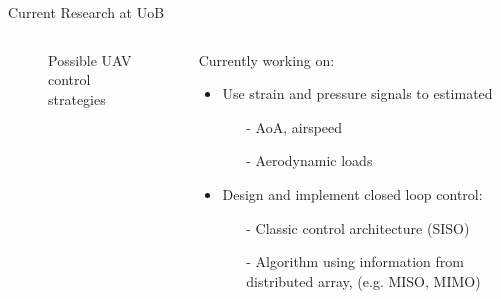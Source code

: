 \documentclass[aspectratio=169]{beamer}            %
\begin{document}
\begin{frame}{Current Research at UoB}

  \vspace{-1.5em}
	\begin{columns}
	  \begin{column}{0.6\textwidth}
		  \begin{figure}[!htb]
        \centering
				
				\caption{Possible UAV control strategies}
				\label{fig:ANN_UAVCtrl_BlockDiagram}
      \end{figure}
		\end{column}
    \begin{column}{0.4\textwidth}
		  Currently working on:
      \pause
      \begin{itemize}[<+->]
        \item{Use strain and pressure signals to estimated}
			  \begin{itemize}[<+->]
			    \item[-]{AoA, airspeed}
          \item[-]{Aerodynamic loads}
			  \end{itemize}
		    \item{Design and implement closed loop control:}
			  \begin{itemize}[<+->]
			    \item[-]{Classic control architecture (SISO)}
          \item[-]{Algorithm using information from distributed array, (e.g. MISO, MIMO)}
			  \end{itemize}
      \end{itemize}
		\end{column}
	\end{columns}

\end{frame}

\end{document}
